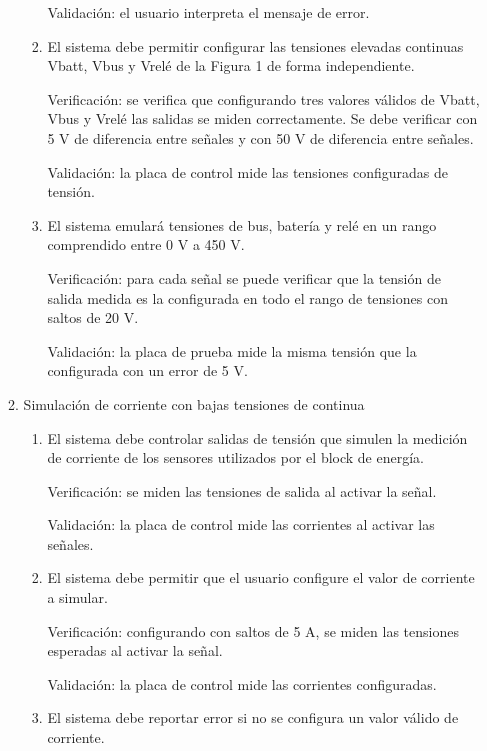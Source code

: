 \documentclass[
11pt, %
codirector, %
]{charter}
\begin{document}
\begin{enumerate}
\begin{enumerate}
\begin{enumerate}
			                  Validación: el usuario interpreta el mensaje de error.

			            \item El sistema debe permitir configurar las tensiones elevadas continuas Vbatt, Vbus y Vrelé de la Figura 1 de forma independiente.

			                  Verificación: se verifica que configurando tres valores válidos de Vbatt, Vbus y Vrelé las salidas se miden correctamente. Se debe verificar con 5 V de diferencia entre señales y con 50 V de diferencia entre señales.

			                  Validación: la placa de control mide las tensiones configuradas de tensión.

			            \item El sistema emulará tensiones de bus, batería y relé en un rango comprendido entre 0 V a 450 V.

			                  Verificación: para cada señal se puede verificar que la tensión de salida medida es la configurada en todo el rango de tensiones con saltos de 20 V.

			                  Validación: la placa de prueba mide la misma tensión que la configurada con un error de 5 V.
		            \end{enumerate}
		      \item Simulación de corriente con bajas tensiones de continua
		            \begin{enumerate}
			            \item El sistema debe controlar salidas de tensión que simulen la medición de corriente de los sensores utilizados por el block de energía.

			                  Verificación: se miden las tensiones de salida al activar la señal.

			                  Validación: la placa de control mide las corrientes al activar las señales.
			            \item El sistema debe permitir que el usuario configure el valor de corriente a simular.

			                  Verificación: configurando con saltos de 5 A, se miden las tensiones esperadas al activar la señal.

			                  Validación: la placa de control mide las corrientes configuradas.

			            \item El sistema debe reportar error si no se configura un valor válido de corriente.


\end{enumerate}
\end{enumerate}
\end{enumerate}
\end{document}
